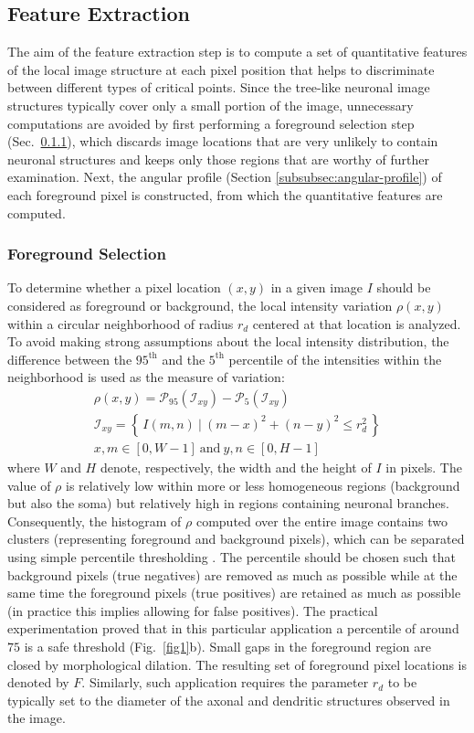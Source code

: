 \subsection{Feature Extraction}
\label{subsec:feature-extraction}
The aim of the feature extraction step is to compute a set of quantitative features of the local image structure at each pixel position that helps to discriminate between different types of critical points. Since the tree-like neuronal image structures typically cover only a small portion of the image, unnecessary computations are avoided by first performing a foreground selection step (Sec.~\ref{subsubsec:foreground-selection}), which discards image locations that are very unlikely to contain neuronal structures and keeps only those regions that are worthy of further examination. Next, the angular profile (Section \ref{subsubsec:angular-profile}) of each foreground pixel is constructed, from which the quantitative features are computed.

\subsubsection{Foreground Selection}
\label{subsubsec:foreground-selection}
To determine whether a pixel location $(x,y)$ in a given image $I$ should be considered as foreground or background, the local intensity variation $\rho(x,y)$ within a circular neighborhood of radius $r_{d}$ centered at that location is analyzed. To avoid making strong assumptions about the local intensity distribution, the difference between the $95^\textrm{th}$ and the $5^\textrm{th}$ percentile of the intensities within the neighborhood is used as the measure of variation:
\begin{gather} 
\rho(x,y) = \mathcal{P}_{95}(\mathcal{I}_{xy}) - \mathcal{P}_{5}(\mathcal{I}_{xy}) \\
\mathcal{I}_{xy} = \left\{\, I(m,n)\ |\ (m-x)^{2}+(n-y)^{2} \leq r_d^2\, \right\} \\
x,m \in [0,W-1]\ \textrm{and}\ y,n \in [0,H-1]
\end{gather}
where $W$ and $H$ denote, respectively, the width and the height of $I$ in pixels. The value of $\rho$ is relatively low within more or less homogeneous regions (background but also the soma) but relatively high in regions containing neuronal branches. Consequently, the histogram of $\rho$ computed over the entire image contains two clusters (representing foreground and background pixels), which can be separated using simple percentile thresholding \cite{doyle1962operations}. The percentile should be chosen such that background pixels (true negatives) are removed as much as possible while at the same time the foreground pixels (true positives) are retained as much as possible (in practice this implies allowing for false positives). The practical experimentation proved that in this particular application a percentile of around $75$ is a safe threshold (Fig.~\ref{fig1}b). Small gaps in the foreground region are closed by morphological dilation. The resulting set of foreground pixel locations is denoted by $F$. Similarly, such application requires the parameter $r_{d}$ to be typically set to the diameter of the axonal and dendritic structures observed in the image.


